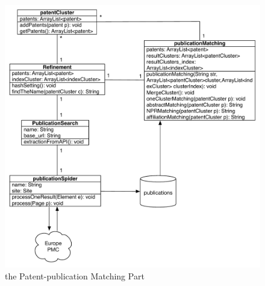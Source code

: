 \begin{figure}
\centering
\includegraphics[width=\headwidth]{publicationMatching.pdf}
\caption{the Patent-publication Matching Part}
\end{figure}


\newpage

